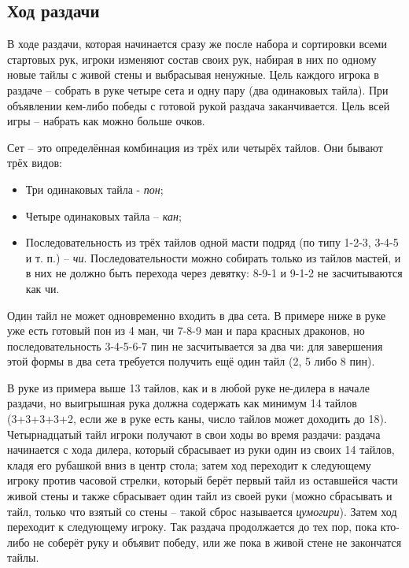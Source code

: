 \subsection{Ход раздачи}

В ходе раздачи, которая начинается сразу же после набора и сортировки всеми стартовых рук, игроки изменяют состав своих рук, набирая в них по одному новые тайлы с живой стены и выбрасывая ненужные. Цель каждого игрока в раздаче – собрать в руке четыре сета и одну пару (два одинаковых тайла). При объявлении кем-либо победы с готовой рукой раздача заканчивается. Цель всей игры – набрать как можно больше очков.

Сет – это определённая комбинация из трёх или четырёх тайлов. Они бывают трёх видов:
\begin{itemize}
	\item Три одинаковых тайла - \textit{пон};
	\item Четыре одинаковых тайла – \textit{кан};
	\item Последовательность из трёх тайлов одной масти подряд (по типу 1-2-3, 3-4-5 и т. п.) – \textit{чи}. Последовательности можно собирать только из тайлов мастей, и в них не должно быть перехода через девятку: 8-9-1 и 9-1-2 не засчитываются как чи.
\end{itemize}

Один тайл не может одновременно входить в два сета. В примере ниже в руке уже есть готовый пон из 4 ман, чи 7-8-9 ман и пара красных драконов, но последовательность 3-4-5-6-7 пин не засчитывается за два чи: для завершения этой формы в два сета требуется получить ещё один тайл (2, 5 либо 8 пин).


В руке из примера выше 13 тайлов, как и в любой руке не-дилера в начале раздачи, но выигрышная рука должна содержать как минимум 14 тайлов (3+3+3+3+2, если же в руке есть каны, число тайлов может доходить до 18). Четырнадцатый тайл игроки получают в свои ходы во время раздачи: раздача начинается с хода дилера, который сбрасывает из руки один из своих 14 тайлов, кладя его рубашкой вниз в центр стола; затем ход переходит к следующему игроку против часовой стрелки, который берёт первый тайл из оставшейся части живой стены и также сбрасывает один тайл из своей руки (можно сбрасывать и тайл, только что взятый со стены – такой сброс называется \textit{цумогири}). Затем ход переходит к следующему игроку. Так раздача продолжается до тех пор, пока кто-либо не соберёт руку и объявит победу, или же пока в живой стене не закончатся тайлы. 

